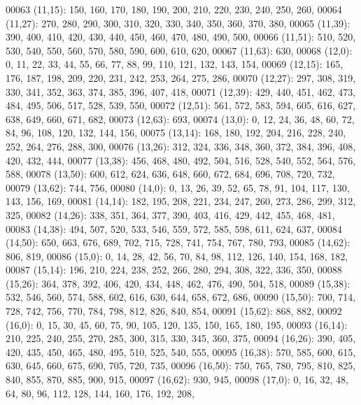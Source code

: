 \begin{DoxyCode}
00063       (11,15): 150, 160, 170, 180, 190, 200, 210, 220, 230, 240, 250, 260,
00064       (11,27): 270, 280, 290, 300, 310, 320, 330, 340, 350, 360, 370, 380,
00065       (11,39): 390, 400, 410, 420, 430, 440, 450, 460, 470, 480, 490, 500,
00066       (11,51): 510, 520, 530, 540, 550, 560, 570, 580, 590, 600, 610, 620,
00067       (11,63): 630,
00068       (12,0): 0, 11, 22, 33, 44, 55, 66, 77, 88, 99, 110, 121, 132, 143, 154,
00069       (12,15): 165, 176, 187, 198, 209, 220, 231, 242, 253, 264, 275, 286,
00070       (12,27): 297, 308, 319, 330, 341, 352, 363, 374, 385, 396, 407, 418,
00071       (12,39): 429, 440, 451, 462, 473, 484, 495, 506, 517, 528, 539, 550,
00072       (12,51): 561, 572, 583, 594, 605, 616, 627, 638, 649, 660, 671, 682,
00073       (12,63): 693,
00074       (13,0): 0, 12, 24, 36, 48, 60, 72, 84, 96, 108, 120, 132, 144, 156,
00075       (13,14): 168, 180, 192, 204, 216, 228, 240, 252, 264, 276, 288, 300,
00076       (13,26): 312, 324, 336, 348, 360, 372, 384, 396, 408, 420, 432, 444,
00077       (13,38): 456, 468, 480, 492, 504, 516, 528, 540, 552, 564, 576, 588,
00078       (13,50): 600, 612, 624, 636, 648, 660, 672, 684, 696, 708, 720, 732,
00079       (13,62): 744, 756,
00080       (14,0): 0, 13, 26, 39, 52, 65, 78, 91, 104, 117, 130, 143, 156, 169,
00081       (14,14): 182, 195, 208, 221, 234, 247, 260, 273, 286, 299, 312, 325,
00082       (14,26): 338, 351, 364, 377, 390, 403, 416, 429, 442, 455, 468, 481,
00083       (14,38): 494, 507, 520, 533, 546, 559, 572, 585, 598, 611, 624, 637,
00084       (14,50): 650, 663, 676, 689, 702, 715, 728, 741, 754, 767, 780, 793,
00085       (14,62): 806, 819,
00086       (15,0): 0, 14, 28, 42, 56, 70, 84, 98, 112, 126, 140, 154, 168, 182,
00087       (15,14): 196, 210, 224, 238, 252, 266, 280, 294, 308, 322, 336, 350,
00088       (15,26): 364, 378, 392, 406, 420, 434, 448, 462, 476, 490, 504, 518,
00089       (15,38): 532, 546, 560, 574, 588, 602, 616, 630, 644, 658, 672, 686,
00090       (15,50): 700, 714, 728, 742, 756, 770, 784, 798, 812, 826, 840, 854,
00091       (15,62): 868, 882,
00092       (16,0): 0, 15, 30, 45, 60, 75, 90, 105, 120, 135, 150, 165, 180, 195,
00093       (16,14): 210, 225, 240, 255, 270, 285, 300, 315, 330, 345, 360, 375,
00094       (16,26): 390, 405, 420, 435, 450, 465, 480, 495, 510, 525, 540, 555,
00095       (16,38): 570, 585, 600, 615, 630, 645, 660, 675, 690, 705, 720, 735,
00096       (16,50): 750, 765, 780, 795, 810, 825, 840, 855, 870, 885, 900, 915,
00097       (16,62): 930, 945,
00098       (17,0): 0, 16, 32, 48, 64, 80, 96, 112, 128, 144, 160, 176, 192, 208,

\end{DoxyCode}
